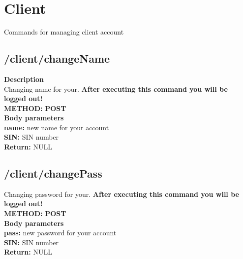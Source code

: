 \documentclass[a4paper, 12pt]{report}
\begin{document}
\section{Client}
Commands for managing client account
\subsection{/client/changeName}
\textbf{\color{redText} Description} \\
Changing name for your. \textbf{After executing this command you will be logged out!} \\
\textbf{\color{redText} METHOD: } \textbf{POST} \\
\textbf{\color{redText} Body parameters} \\
\textbf{name: } new name for your account\\
\textbf{SIN: } SIN number\\
\textbf{\color{redText} Return: } NULL\\

\subsection{/client/changePass}
Changing password for your. \textbf{After executing this command you will be logged out!} \\
\textbf{\color{redText} METHOD: } \textbf{POST} \\
\textbf{\color{redText} Body parameters} \\
\textbf{pass: } new password for your account\\
\textbf{SIN: } SIN number\\
\textbf{\color{redText} Return: } NULL\\
\end{document}
